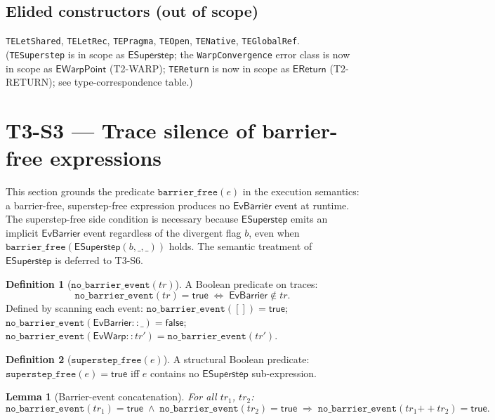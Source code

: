 \documentclass[11pt,a4paper]{article}
\theoremstyle{definition}
\newtheorem{definition}{Definition}[section]
\theoremstyle{plain}
\newtheorem{lemma}[theorem]{Lemma}
\theoremstyle{remark}
\newcommand{\barrierfree}[1]{\mathtt{barrier\_free}(#1)}
\begin{document}
\subsection*{Elided constructors (out of scope)}

\texttt{TELetShared}, \texttt{TELetRec},
\texttt{TEPragma}, \texttt{TEOpen}, \texttt{TENative}, \texttt{TEGlobalRef}.
(\texttt{TESuperstep} is in scope as $\mathsf{ESuperstep}$; the
\texttt{WarpConvergence} error class is now in scope as $\mathsf{EWarpPoint}$
(T2-WARP); \texttt{TEReturn} is now in scope as $\mathsf{EReturn}$
(T2-RETURN); see type-correspondence table.)

\section{T3-S3 --- Trace silence of barrier-free expressions}
\label{sec:trace-silence}

This section grounds the predicate $\barrierfree{e}$ in the execution semantics:
a barrier-free, superstep-free expression produces no $\mathsf{EvBarrier}$ event
at runtime.  The superstep-free side condition is necessary because
$\mathsf{ESuperstep}$ emits an implicit $\mathsf{EvBarrier}$ event regardless of
the divergent flag $b$, even when $\barrierfree{\mathsf{ESuperstep}(b,\_,\_)}$
holds.  The semantic treatment of $\mathsf{ESuperstep}$ is deferred to T3-S6.

\begin{definition}[$\mathtt{no\_barrier\_event}(\mathit{tr})$]
\label{def:no-barrier-event}
A Boolean predicate on traces:
\[
  \mathtt{no\_barrier\_event}(\mathit{tr}) = \mathsf{true}
  \;\iff\;
  \mathsf{EvBarrier} \notin \mathit{tr}.
\]
Defined by scanning each event: $\mathtt{no\_barrier\_event}([]) = \mathsf{true}$;
$\mathtt{no\_barrier\_event}(\mathsf{EvBarrier} :: \_) = \mathsf{false}$;
$\mathtt{no\_barrier\_event}(\mathsf{EvWarp} :: \mathit{tr'}) = \mathtt{no\_barrier\_event}(\mathit{tr'})$.
\end{definition}

\begin{definition}[$\mathtt{superstep\_free}(e)$]
\label{def:superstep-free}
A structural Boolean predicate: $\mathtt{superstep\_free}(e) = \mathsf{true}$
iff $e$ contains no $\mathsf{ESuperstep}$ sub-expression.
\end{definition}

\begin{lemma}[Barrier-event concatenation]
  \label{lem:no-barrier-app}
  For all $\mathit{tr}_1$, $\mathit{tr}_2$:
  \[
    \mathtt{no\_barrier\_event}(\mathit{tr}_1) = \mathsf{true}
    \;\land\;
    \mathtt{no\_barrier\_event}(\mathit{tr}_2) = \mathsf{true}
    \;\Rightarrow\;
    \mathtt{no\_barrier\_event}(\mathit{tr}_1 \mathbin{++} \mathit{tr}_2) = \mathsf{true}.
  \]
\end{lemma}
\end{document}
